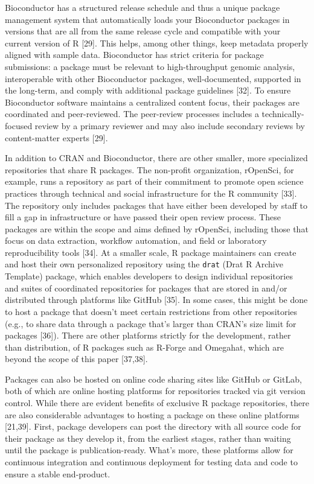 \documentclass[10pt,letterpaper]{article}
\begin{document}
Bioconductor has a structured release schedule and thus a unique package
management system that automatically loads your Bioconductor packages in
versions that are all from the same release cycle and compatible with
your current version of R {[}29{]}. This helps, among other things, keep
metadata properly aligned with sample data. Bioconductor has strict
criteria for package submissions: a package must be relevant to
high-throughput genomic analysis, interoperable with other Bioconductor
packages, well-documented, supported in the long-term, and comply with
additional package guidelines {[}32{]}. To ensure Bioconductor software
maintains a centralized content focus, their packages are coordinated
and peer-reviewed. The peer-review processes includes a
technically-focused review by a primary reviewer and may also include
secondary reviews by content-matter experts {[}29{]}.

In addition to CRAN and Bioconductor, there are other smaller, more
specialized repositories that share R packages. The non-profit
organization, rOpenSci, for example, runs a repository as part of their
commitment to promote open science practices through technical and
social infrastructure for the R community {[}33{]}. The repository only
includes packages that have either been developed by staff to fill a gap
in infrastructure or have passed their open review process. These
packages are within the scope and aims defined by rOpenSci, including
those that focus on data extraction, workflow automation, and field or
laboratory reproducibility tools {[}34{]}. At a smaller scale, R package
maintainers can create and host their own personalized repository using
the \texttt{drat} (Drat R Archive Template) package, which enables
developers to design individual repositories and suites of coordinated
repositories for packages that are stored in and/or distributed through
platforms like GitHub {[}35{]}. In some cases, this might be done to
host a package that doesn't meet certain restrictions from other
repositories (e.g., to share data through a package that's larger than
CRAN's size limit for packages {[}36{]}). There are other platforms
strictly for the development, rather than distribution, of R packages
such as R-Forge and Omegahat, which are beyond the scope of this paper
{[}37,38{]}.

Packages can also be hosted on online code sharing sites like GitHub or
GitLab, both of which are online hosting platforms for repositories
tracked via git version control. While there are evident benefits of
exclusive R package repositories, there are also considerable advantages
to hosting a package on these online platforms {[}21,39{]}. First,
package developers can post the directory with all source code for their
package as they develop it, from the earliest stages, rather than
waiting until the package is publication-ready. What's more, these
platforms allow for continuous integration and continuous deployment for
testing data and code to ensure a stable end-product.
\end{document}
